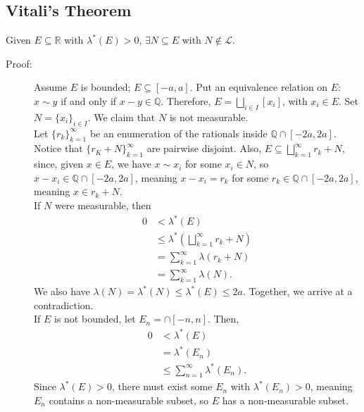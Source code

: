 \documentclass[9pt]{extarticle}
\newcommand{\Q}{\mathbb{Q}}
\newcommand{\R}{\mathbb{R}}
\begin{document}
  \subsection{Vitali's Theorem}%
  Given $E\subseteq \R$ with $\lambda^{\ast}(E) > 0$, $\exists N\subseteq E$ with $N\notin \mathcal{L}$.
  \begin{description}
    \item[Proof:] Assume $E$ is bounded; $E\subseteq [-a,a]$. Put an equivalence relation on $E$: $x\sim y$ if and only if $x-y\in\Q$. Therefore, $E = \bigsqcup_{i\in I}[x_i]$, with $x_i\in E$. Set $N = \{x_i\}_{i\in I}$. We claim that $N$ is not measurable.\\

      Let $\{r_k\}_{k=1}^{\infty}$ be an enumeration of the rationals inside $\Q\cap [-2a,2a]$. Notice that $\{r_K + N\}_{k=1}^{\infty}$ are pairwise disjoint. Also, $E\subseteq \bigsqcup_{k=1}^{\infty}r_k + N$, since, given $x\in E$, we have $x\sim x_i$ for some $x_i\in N$, so $x-x_i\in \Q\cap [-2a,2a]$, meaning $x-x_i=r_k$ for some $r_k\in \Q\cap [-2a,2a]$, meaning $x \in r_k + N$.\\

      If $N$ were measurable, then 
      \begin{align*}
        0 &< \lambda^{\ast}(E)\\
          &\leq \lambda^{\ast}\left(\bigsqcup_{k=1}^{\infty}r_k + N\right)\\
          &= \sum_{k=1}^{\infty} \lambda(r_k + N)\\
          &= \sum_{k=1}^{\infty}\lambda(N).
      \end{align*}
      We also have $\lambda(N) = \lambda^{\ast}(N) \leq \lambda^{\ast}(E) \leq 2a$. Together, we arrive at a contradiction.\\

      If $E$ is not bounded, let $E_n = \cap [-n,n]$. Then,
      \begin{align*}
        0 &< \lambda^{\ast}(E)\\
          &= \lambda^{\ast}(E_n)\\
          &\leq \sum_{n=1}^{\infty}\lambda^{\ast}(E_n).
      \end{align*}
      Since $\lambda^{\ast}(E) > 0$, there must exist some $E_n$ with $\lambda^{\ast}(E_n) > 0$, meaning $E_n$ contains a non-measurable subset, so $E$ has a non-measurable subset.
  \end{description}
\end{document}
